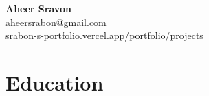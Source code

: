 \documentclass[11pt]{article} %
\newcommand{\mytitle}[4]{
  \begin{center}
    \Large\textbf{#1}\normalsize \\ %
    \href{mailto:#2}{#2} \\ %
    \href{https://#3}{#3} \\ %
    #4 %
  \end{center}
}
\begin{document}
\mytitle{Aheer Sravon}{aheersrabon@gmail.com}{srabon-s-portfolio.vercel.app/portfolio/projects}%


\RaggedRight


\section*{Education}








\end{document}
